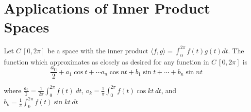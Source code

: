 \documentclass{article}
\begin{document}
\section*{Applications of Inner Product Spaces}

Let $C\:[0,2\pi]$ be a space with the inner product
$\langle f, g \rangle = \int_0^{2\pi} f(t)g(t)dt$. The function which approximates as closely as
desired for any function in $C\:[0,2\pi]$ is 
\[\frac{a_0}{2} + a_1\cos t + \cdots a_n \cos nt + b_1 \sin t + \cdots + b_n \sin nt\]

where $\frac{a_0}{2} = \frac{1}{2\pi}\int_0^{2\pi} f(t) \: dt$,
$a_k=\frac{1}{\pi}\int_0^{2\pi}f(t)\cos kt \: dt$, and
$b_k=\frac{1}{\pi}\int_0^{2\pi}f(t)\sin kt \: dt$
\end{document}
